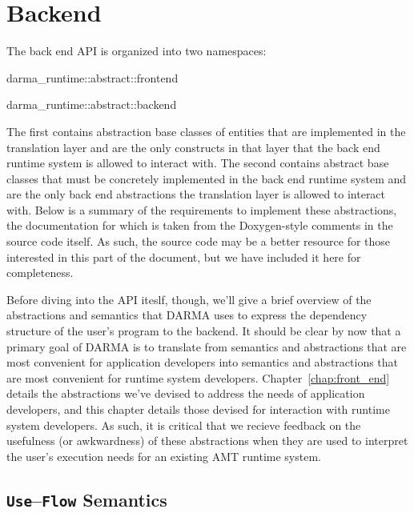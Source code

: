 
\chapter{Backend}
\label{chap:back_end}

\lstMakeShortInline[style=CppCodeInlineStyle]{\|}

The \gls{back end} \gls{API} is organized into two namespaces:
\begin{compactitem}
\item {\ttfamily darma\_runtime::abstract::frontend} 
\item {\ttfamily darma\_runtime::abstract::backend}  
\end{compactitem}

The first contains
abstraction base classes of entities that are implemented in the \gls{translation
layer} and are the only constructs in that layer that the \gls{back end}
\gls{runtime system} is
allowed to interact with.  The second contains abstract base classes that must
be concretely implemented in the \gls{back end} \gls{runtime system} and
are the only \gls{back end} abstractions the \gls{translation layer} is allowed to interact
with.  Below is a summary of the requirements to implement these abstractions,
the documentation for which is taken from the Doxygen-style comments in
the source code itself.  As such, the source code may be a better resource for
those interested in this part of the document, but we have included it here for
completeness. 

Before diving into the API iteslf, though, we'll give a brief overview of the abstractions and
semantics that DARMA uses to express the dependency structure of the user's program to the
backend.  It should be clear by now that a primary goal of DARMA is to translate from semantics and
abstractions that are most convenient for application developers into semantics and abstractions
that are most convenient for runtime system developers.  Chapter~\ref{chap:front_end} details the
abstractions we've devised to address the needs of application developers, and this chapter details
those devised for interaction with runtime system developers.  As such, it is critical that we
recieve feedback on the usefulness (or awkwardness) of these abstractions when they are used to 
interpret the user's execution needs for an existing AMT \gls{runtime system}.

\section{{\tt Use}--{\tt Flow} Semantics}

